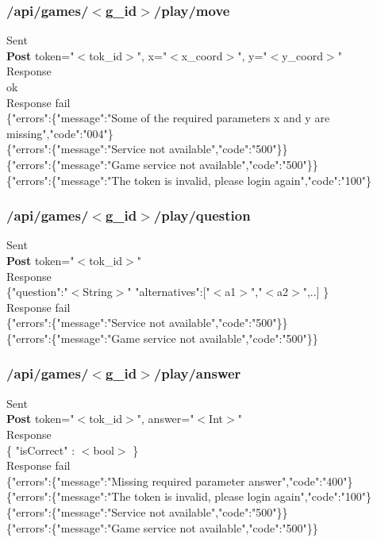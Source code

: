 \subsubsection{/api/games/$<$g\_id$>$/play/move}
\tab	Sent\\
\tab\tab	\textbf{Post} token="$<$tok\_id$>$", x="$<$x\_coord$>$", y="$<$y\_coord$>$"\\
\tab	Response \\
\tab{} ok\\
\tab	Response fail\\
\tab\tab	\{"errors":\{"message":"Some of the required parameters x and y are missing","code":"004"\}\\
\tab\tab	\{"errors":\{"message":"Service not available","code":"500"\}\}\\
\tab\tab	\{"errors":\{"message":"Game service not available","code":"500"\}\}\\
\tab\tab	\{"errors":\{"message":"The token is invalid, please login again","code":"100"\}\\

\subsubsection{/api/games/$<$g\_id$>$/play/question}
\tab	Sent\\
\tab\tab	\textbf{Post} token="$<$tok\_id$>$"\\
\tab	Response\\
\tab\tab	\{"question":"$<$String$>$" "alternatives":$[$"$<$a1$>$","$<$a2$>$",..$]$ \}\\
\tab	Response fail\\
\tab\tab	\{"errors":\{"message":"Service not available","code":"500"\}\}\\
\tab\tab	\{"errors":\{"message":"Game service not available","code":"500"\}\}\\

\subsubsection{/api/games/$<$g\_id$>$/play/answer}
\tab	Sent\\
\tab\tab	\textbf{Post} token="$<$tok\_id$>$", answer="$<$Int$>$" \\
\tab	Response\\
\tab\tab	\{ "isCorrect" : $<$bool$>$ \}\\
\tab	Response fail\\
\tab\tab	\{"errors":\{"message":"Missing required parameter answer","code":"400"\}\\
\tab\tab	\{"errors":\{"message":"The token is invalid, please login again","code":"100"\}\\
\tab\tab	\{"errors":\{"message":"Service not available","code":"500"\}\}\\
\tab\tab	\{"errors":\{"message":"Game service not available","code":"500"\}\}\\


